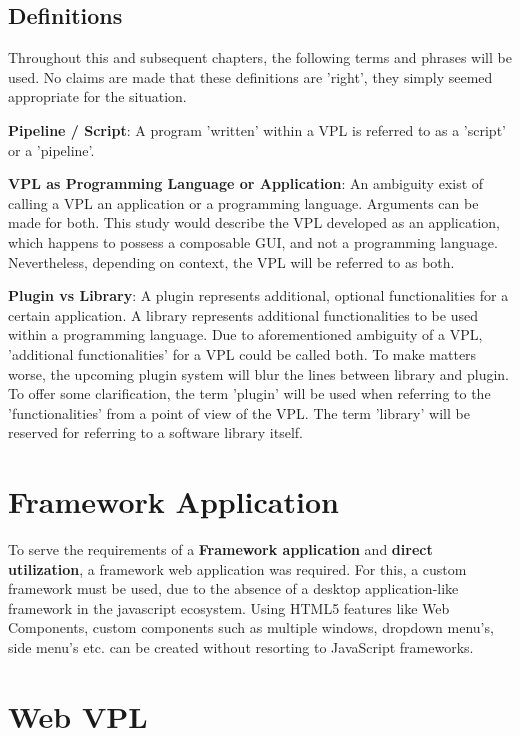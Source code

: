 \subsection{Definitions}

Throughout this and subsequent chapters, the following terms and phrases will be used.
No claims are made that these definitions are 'right', they simply seemed appropriate for the situation.

\textbf{Pipeline / Script}: A program 'written' within a VPL is referred to as a 'script' or a 'pipeline'.

\textbf{VPL as Programming Language or Application}: An ambiguity exist of calling a VPL an application or a programming language. 
Arguments can be made for both. 
This study would describe the VPL developed as an application, which happens to possess a composable \ac{GUI}, and not a programming language.
Nevertheless, depending on context, the VPL will be referred to as both.

\textbf{Plugin vs Library}: A plugin represents additional, optional functionalities for a certain application.
A library represents additional functionalities to be used within a programming language. 
Due to aforementioned ambiguity of a VPL, 'additional functionalities' for a VPL could be called both. 
To make matters worse, the upcoming plugin system will blur the lines between library and plugin. 
To offer some clarification, the term 'plugin' will be used when referring to the 'functionalities' from a point of view of the VPL.
The term 'library' will be reserved for referring to a software library itself. 


\section{Framework Application}

To serve the requirements of a \textbf{Framework application} and \textbf{direct utilization}, a framework web application was required. 
For this, a custom framework must be used, due to the absence of a desktop application-like framework in the javascript ecosystem.
Using HTML5 features like Web Components, custom components such as multiple windows, dropdown menu's, side menu's etc. can be created without resorting to JavaScript frameworks.


\section{Web VPL} 
\label{sec:method:base-vpl}

